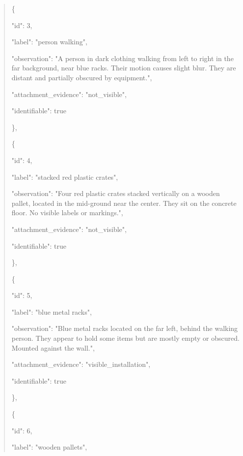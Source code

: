 \documentclass[10pt,a4paper]{article}
\begin{document}
\begin{quote}
    \{\par
      "id":\allowbreak{} 3,\allowbreak{}\par
      "label":\allowbreak{} "person walking",\allowbreak{}\par
      "observation":\allowbreak{} "A person in dark clothing walking from left to right in the far background,\allowbreak{} near blue racks. Their motion causes slight blur. They are distant and partially obscured by equipment.",\allowbreak{}\par
      "attachment\_evidence":\allowbreak{} "not\_visible",\allowbreak{}\par
      "identifiable":\allowbreak{} true\par
    \},\allowbreak{}\par
    \{\par
      "id":\allowbreak{} 4,\allowbreak{}\par
      "label":\allowbreak{} "stacked red plastic crates",\allowbreak{}\par
      "observation":\allowbreak{} "Four red plastic crates stacked vertically on a wooden pallet,\allowbreak{} located in the mid-ground near the center. They sit on the concrete floor. No visible labels or markings.",\allowbreak{}\par
      "attachment\_evidence":\allowbreak{} "not\_visible",\allowbreak{}\par
      "identifiable":\allowbreak{} true\par
    \},\allowbreak{}\par
    \{\par
      "id":\allowbreak{} 5,\allowbreak{}\par
      "label":\allowbreak{} "blue metal racks",\allowbreak{}\par
      "observation":\allowbreak{} "Blue metal racks located on the far left,\allowbreak{} behind the walking person. They appear to hold some items but are mostly empty or obscured. Mounted against the wall.",\allowbreak{}\par
      "attachment\_evidence":\allowbreak{} "visible\_installation",\allowbreak{}\par
      "identifiable":\allowbreak{} true\par
    \},\allowbreak{}\par
    \{\par
      "id":\allowbreak{} 6,\allowbreak{}\par
      "label":\allowbreak{} "wooden pallets",\allowbreak{}\par

\end{quote}
\end{document}
